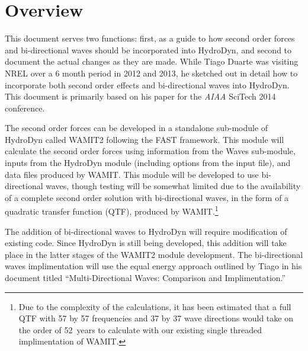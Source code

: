 \chapter{Overview}
\label{chap:Overview}
This document serves two functions: first, as a guide to how second order forces and bi-directional waves should be incorporated into HydroDyn, and second to document the actual changes as they are made. While Tiago Duarte was visiting NREL over a 6 month period in 2012 and 2013, he sketched out in detail how to incorporate both second order effects and bi-directional waves into HydroDyn. This document is primarily based on his paper for the \emph{AIAA} SciTech 2014 conference\cite{duarte:2014}.

The second order forces can be developed in a standalone sub-module of HydroDyn called WAMIT2 following the FAST framework. This module will calculate the second order forces using information from the Waves sub-module, inputs from the HydroDyn module (including options from the input file), and data files produced by WAMIT. This module will be developed to use bi-directional waves, though testing will be somewhat limited due to the availability of a complete second order solution with bi-directional waves, in the form of a quadratic transfer function (QTF), produced by WAMIT.\footnote{Due to the complexity of the calculations, it has been estimated that a full QTF with 57 by 57 frequencies and 37 by 37 wave directions would take on the order of 52~years to calculate with our existing single threaded implimentation of WAMIT.}

The addition of bi-directional waves to HydroDyn will require modification of existing code. Since HydroDyn is still being developed, this addition will take place in the latter stages of the WAMIT2 module development. The bi-directional waves implimentation will use the equal energy approach outlined by Tiago in his document titled ``Multi-Directional Waves: Comparison and Implimentation.''





